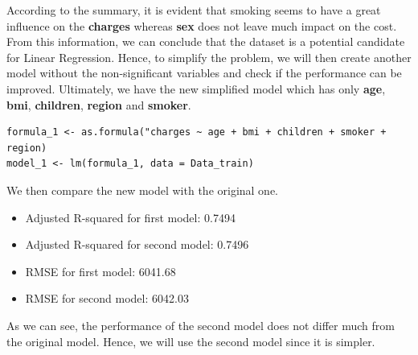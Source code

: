 \documentclass[a4paper]{article}
\begin{document}
According to the summary, it is evident that smoking seems to have a great influence on the \textbf{charges} whereas \textbf{sex} does not leave much impact on the cost. From this information, we can conclude that the dataset is a potential candidate for Linear Regression. Hence, to simplify the problem, we will then create another model without the non-significant variables and check if the performance can be improved. Ultimately, we have the new simplified model which has only \textbf{age}, \textbf{bmi}, \textbf{children}, \textbf{region} and \textbf{smoker}.
\begin{lstlisting}
formula_1 <- as.formula("charges ~ age + bmi + children + smoker + region)
model_1 <- lm(formula_1, data = Data_train)
\end{lstlisting}
We then compare the new model with the original one.
\begin{itemize}
    \item Adjusted R-squared for first model: 0.7494
    \item Adjusted R-squared for second model: 0.7496
    \item RMSE for first model: 6041.68
    \item RMSE for second model: 6042.03
\end{itemize}
As we can see, the performance of the second model does not differ much from the original model. Hence, we will use the second model since it is simpler.
\end{document}
